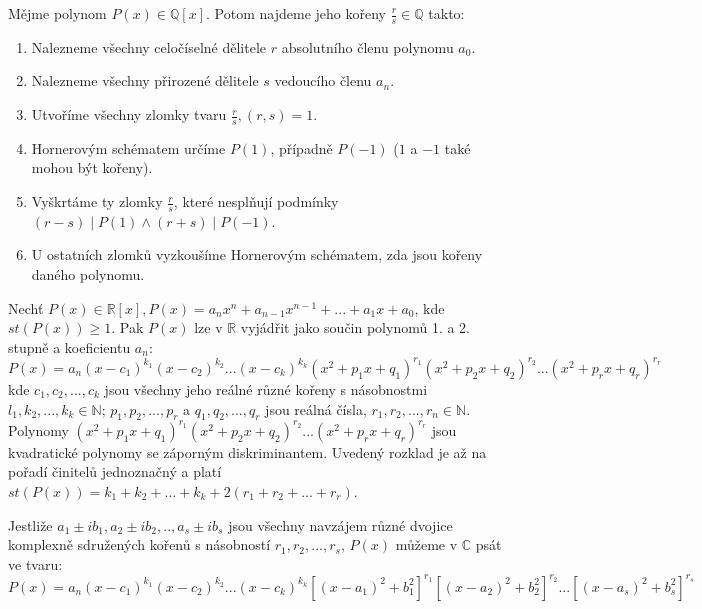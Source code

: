 \begin{veta}
  Mějme polynom $P(x) \in \mathbb Q [x]$. Potom najdeme jeho kořeny $\frac{r}{s} \in \mathbb Q$ takto:
  \begin{enumerate}[1.]
    \item Nalezneme všechny celočíselné dělitele $r$ absolutního členu polynomu $a_0$.
    \item Nalezneme všechny přirozené dělitele $s$ vedoucího členu $a_n$.
    \item Utvoříme všechny zlomky tvaru $\frac{r}{s}, (r,s) = 1$.
    \item Hornerovým schématem určíme $P(1)$, případně $P(-1)$ ($1$ a $-1$ také mohou být kořeny).
    \item Vyškrtáme ty zlomky $\frac{r}{s}$, které nesplňují podmínky $(r-s) \mid P(1) \land (r+s) \mid P(-1)$.
    \item U ostatních zlomků vyzkoušíme Hornerovým schématem, zda jsou kořeny daného polynomu.
  \end{enumerate}
\end{veta}

\begin{veta}
  Nechť $P(x) \in \mathbb R [x], P(x) = a_n x^n + a_{n-1} x^{n-1} + ... + a_1 x + a_0$, kde $st(P(x)) \geq 1$. Pak $P(x)$ lze v $\mathbb R$ vyjádřit jako součin polynomů 1. a 2. stupně a koeficientu $a_n$:
  \[
    P(x) = a_n(x-c_1)^{k_1}(x-c_2)^{k_2} ... (x-c_k)^{k_k}(x^2+p_1 x + q_1)^{r_1}(x^2+p_2 x + q_2)^{r_2} ... (x^2+p_r x + q_r)^{r_r}
  \]
  kde $c_1,c_2, ..., c_k$ jsou všechny jeho reálné různé kořeny s násobnostmi $l_1, k_2, ..., k_k \in \mathbb N$; $p_1, p_2, ..., p_r$ a $q_1, q_2, ..., q_r$ jsou reálná čísla, $r_1, r_2, ..., r_n \in \mathbb N$.
  Polynomy $(x^2+p_1 x + q_1)^{r_1}(x^2+p_2 x + q_2)^{r_2} ... (x^2+p_r x + q_r)^{r_r}$ jsou kvadratické polynomy se záporným diskriminantem. Uvedený rozklad je až na pořadí činitelů jednoznačný a platí $st(P(x)) = k_1 + k_2 + ... + k_k + 2(r_1 + r_2 + ... + r_r)$.

  Jestliže $a_1 \pm ib_1, a_2 \pm ib_2, .., a_s \pm ib_s$ jsou všechny navzájem různé dvojice komplexně sdružených kořenů s násobností $r_1, r_2, ..., r_s$, $P(x)$ můžeme v $\mathbb C$ psát ve tvaru:
  \[
    P(x) = a_n(x-c_1)^{k_1}(x-c_2)^{k_2} ... (x-c_k)^{k_k}[(x-a_1)^2+b_1^2]^{r_1}[(x-a_2)^2+b_2^2]^{r_2} ... [(x-a_s)^2+b_s^2]^{r_s}
  \]
\end{veta}

